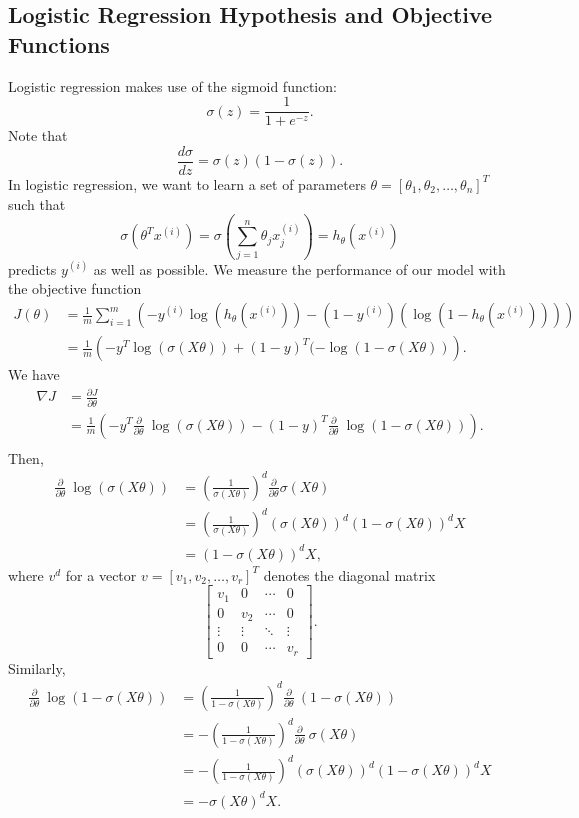 \documentclass{article}
\begin{document}
\subsection{Logistic Regression Hypothesis and Objective Functions}
Logistic regression makes use of the sigmoid function: 
$$\sigma(z) = \frac{1}{1 + e^{-z}}.$$
Note that
$$\frac{d\sigma}{dz} = \sigma(z)(1 - \sigma(z)).$$
In logistic regression, we want to learn a set of parameters $\theta = [\theta_1, \theta_2, \dots, \theta_n]^T$ such that
$$\sigma(\theta^T x^{(i)}) = \sigma\left(\sum_{j = 1}^{n} \theta_j x_j^{(i)} \right) = h_\theta(x^{(i)})$$
predicts $y^{(i)}$ as well as possible. We measure the performance of our model with the objective function
\begin{align*}
J(\theta) &= \frac{1}{m}\sum_{i=1}^{m} \left(-y^{(i)}\log(h_\theta(x^{(i)})) - (1-y^{(i)})(\log(1 - h_\theta(x^{(i)})))\right)\\
&= \frac{1}{m}\left(-y^T\log(\sigma(X\theta)) + (1-y)^T(-\log(1-\sigma(X\theta))\right).
\end{align*}
We have
\begin{align*}
\nabla J &= \frac{\partial J}{\partial \theta} \\
&= \frac{1}{m} \left(-y^T\frac{\partial}{\partial \theta}~ \log(\sigma(X\theta)) - (1-y)^T\frac{\partial}{\partial \theta}~\log(1-\sigma(X\theta))\right). \\
\end{align*}
Then,
\begin{align*}
\frac{\partial}{\partial \theta}~ \log(\sigma(X\theta)) &= \left(\frac{1}{\sigma(X\theta)}\right)^d \frac{\partial}{\partial \theta} \sigma(X\theta)\\
&= \left(\frac{1}{\sigma(X\theta)}\right)^d (\sigma(X\theta))^d(1 - \sigma(X\theta))^dX\\
&= (1 - \sigma(X\theta))^dX,
\end{align*}
where $v^d$ for a vector $v = [v_1, v_2, \dots, v_r]^T$ denotes the diagonal matrix
$$\left[\begin{array}{cccc}
v_1 & 0 & \cdots & 0\\
0 & v_2 & \cdots & 0\\
\vdots & \vdots & \ddots & \vdots\\
0 & 0 & \cdots & v_r\end{array}\right].
$$
Similarly,
\begin{align*}
\frac{\partial}{\partial \theta}~\log(1-\sigma(X\theta)) &= \left(\frac{1}{1-\sigma(X\theta)}\right)^d \frac{\partial}{\partial \theta}~(1 - \sigma(X\theta))\\
&= -\left(\frac{1}{1-\sigma(X\theta)}\right)^d\frac{\partial}{\partial \theta}~ \sigma(X\theta)\\
&= -\left(\frac{1}{1-\sigma(X\theta)}\right)^d(\sigma(X\theta))^d(1 - \sigma(X\theta))^dX\\
&= -\sigma(X\theta)^dX.
\end{align*}
\end{document}
